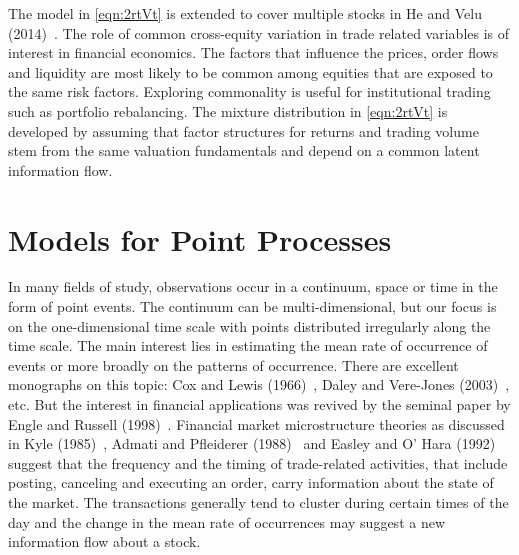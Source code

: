 The model in \eqref{eqn:2rtVt} is extended to cover multiple stocks in He and Velu (2014)~\cite{hevelu}. The role of common cross-equity variation in trade related variables is of interest in financial economics. The factors that influence the prices, order flows and liquidity are most likely to be common among equities that are exposed to the same risk factors. Exploring commonality is useful for institutional trading such as portfolio rebalancing. The mixture distribution in \eqref{eqn:2rtVt} is developed by assuming that factor structures for returns and trading volume stem from the same valuation fundamentals and depend on a common latent information flow.  



\section{Models for Point Processes}


In many fields of study, observations occur in a continuum, space or time in the form of point events. The continuum can be multi-dimensional, but our focus is on the one-dimensional time scale with points distributed irregularly along the time scale. The main interest lies in estimating the mean rate of occurrence of events or more broadly on the patterns of occurrence. There are excellent monographs on this topic: Cox and Lewis (1966)~\cite{cox1966}, Daley and Vere-Jones (2003)~\cite{daley2003}, etc. But the interest in financial applications was revived by the seminal paper by Engle and Russell (1998)~\cite{engle1998}. Financial market microstructure theories as discussed in Kyle (1985)~\cite{kyle1985}, Admati and Pfleiderer (1988)~\cite{admati1988theory} and Easley and O' Hara (1992)~\cite{easley1992} suggest that the frequency and the timing of trade-related activities, that include posting, canceling and executing an order, carry information about the state of the market. The transactions generally tend to cluster during certain times of the day and the change in the mean rate of occurrences may suggest a new information flow about a stock.


